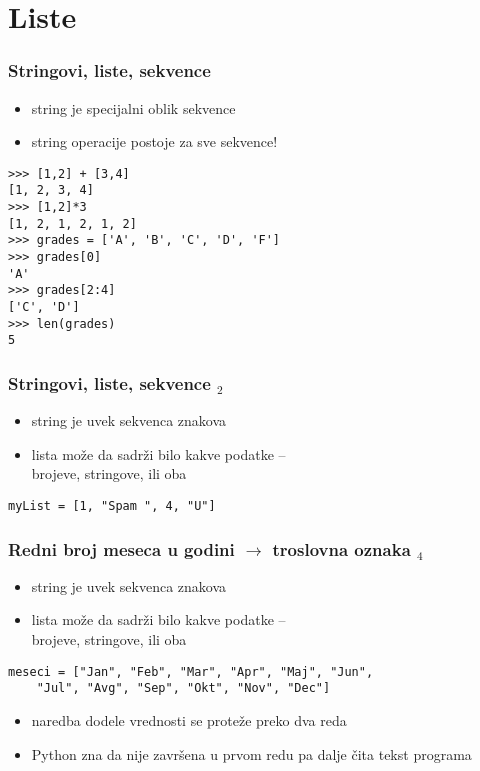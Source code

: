 \documentclass[utf8,compress]{beamer}
\begin{document}
\section{Liste}

\begin{frame}[fragile]
  \frametitle{Stringovi, liste, sekvence}
  \begin{itemize}
    \item string je specijalni oblik sekvence
    \item string operacije postoje za sve sekvence!
  \end{itemize}
\begin{verbatim}
>>> [1,2] + [3,4]
[1, 2, 3, 4]
>>> [1,2]*3
[1, 2, 1, 2, 1, 2]
>>> grades = ['A', 'B', 'C', 'D', 'F']
>>> grades[0]
'A'
>>> grades[2:4]
['C', 'D']
>>> len(grades)
5
\end{verbatim}
\end{frame}

\begin{frame}[fragile]
  \frametitle{Stringovi, liste, sekvence $_2$}
  \begin{itemize}
    \item string je uvek sekvenca znakova
    \item lista može da sadrži bilo kakve podatke -- \\ brojeve, stringove, ili oba
  \end{itemize}
\begin{verbatim}
myList = [1, "Spam ", 4, "U"]
\end{verbatim}
\end{frame}

\begin{frame}[fragile]
  \frametitle{Redni broj meseca u godini $\rightarrow$ troslovna oznaka $_4$}
  \begin{itemize}
    \item string je uvek sekvenca znakova
    \item lista može da sadrži bilo kakve podatke -- \\ brojeve, stringove, ili oba
  \end{itemize}
\begin{verbatim}
meseci = ["Jan", "Feb", "Mar", "Apr", "Maj", "Jun", 
    "Jul", "Avg", "Sep", "Okt", "Nov", "Dec"]
\end{verbatim}
  \begin{itemize}
    \item naredba dodele vrednosti se proteže preko dva reda
    \item Python zna da nije završena u prvom redu pa dalje čita tekst programa
  \end{itemize}
\end{frame}
\end{document}
